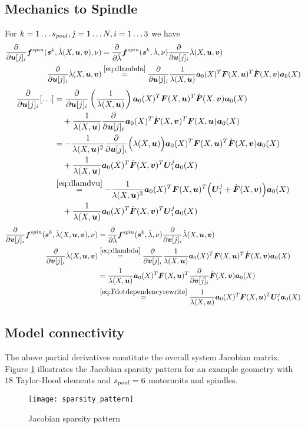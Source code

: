 \subsection{Mechanics to Spindle}
For $k=1\ldots{s_{pool}}, j = 1\ldots N, i=1\ldots3$ we have
\begin{align}
	\d{}{\vu[j]_i}\fsp(\vs^k,\dla(X,\vu,\vv),\nu) &= \d{}{\dla}\fsp(\vs^k,\dla,\nu)\d{}{\vu[j]_i}\dla(X,\vu,\vv)\\
	\d{}{\vu[j]_i}\dla(X,\vu,\vv) &\re{eq:dlambda} \d{}{\vu[j]_i}\frac{1}{\la(X,\vu)}\va_0(X)^T\vF(X,\vu)^T\dot{\vF}(X,\vv)\va_0(X)
\end{align}
\begin{align*}
   \d{}{\vu[j]_i} [\ldots] &= \d{}{\vu[j]_i}\left(\frac{1}{\la(X,\vu)}\right)\va_0(X)^T\vF(X,\vu)^T\dot{\vF}(X,\vv)\va_0(X)\\
   &\quad+ \frac{1}{\la(X,\vu)}\d{}{\vu[j]_i}\va_0(X)^T\dot{\vF}(X,\vv)^T\vF(X,\vu)\va_0(X)\\
   &= -\frac{1}{\la(X,\vu)^2}\d{}{\vu[j]_i}\Bigl(\la(X,\vu)\Bigr)\va_0(X)^T\vF(X,\vu)^T\dot{\vF}(X,\vv)\va_0(X)\\
   &\quad+ \frac{1}{\la(X,\vu)}\va_0(X)^T\dot{\vF}(X,\vv)^T\vU_i^j\va_0(X)\\
   &\re{eq:dlamdvu} -\frac{1}{\la(X,\vu)^3}\va_0(X)^T\vF(X,\vu)^T\Bigl(\vU_i^j+\dot{\vF}(X,\vv)\Bigr)\va_0(X)\\
   &\quad+ \frac{1}{\la(X,\vu)}\va_0(X)^T\dot{\vF}(X,\vv)^T\vU_i^j\va_0(X)
\end{align*}
\begin{align}
	\d{}{\vv[j]_i}\fsp(\vs^k,\dla(X,\vu,\vv),\nu) &= \d{}{\dla}\fsp(\vs^k,\dla,\nu)\d{}{\vv[j]_i}\dla(X,\vu,\vv)\\
	\d{}{\vv[j]_i}\dla(X,\vu,\vv) &\re{eq:dlambda} \d{}{\vv[j]_i}\frac{1}{\la(X,\vu)}\va_0(X)^T\vF(X,\vu)^T\dot{\vF}(X,\vv)\va_0(X)\\
		&=\frac{1}{\la(X,\vu)}\va_0(X)^T\vF(X,\vu)^T\d{}{\vv[j]_i}\dot{\vF}(X,\vv)\va_0(X)\\
		&\re{eq:Fdotdependencyrewrite}\frac{1}{\la(X,\vu)}\va_0(X)^T\vF(X,\vu)^T\vU^j_i\va_0(X)
\end{align}

\subsection{Model connectivity}
The above partial derivatives constitute the overall system Jacobian matrix.
Figure \ref{fig:jacpattern} illustrates the Jacobian sparsity pattern for an example geometry with $18$ Taylor-Hood elements and ${s_{pool}}=6$ motorunits and spindles.
\begin{figure}[!ht]
	\texttt{[image: sparsity\_pattern]}
	\caption{Jacobian sparsity pattern}
	\label{fig:jacpattern}
\end{figure}
